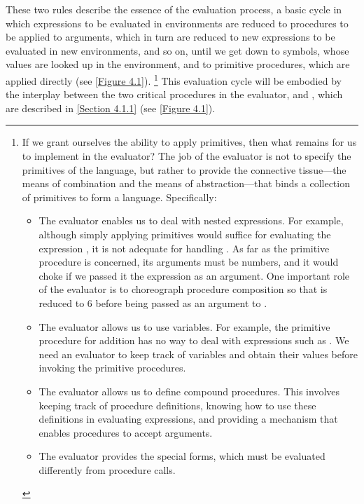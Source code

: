 These two rules describe the essence of the evaluation process, a basic cycle in which expressions to be evaluated in environments are reduced to procedures to be applied to arguments, which in turn are reduced to new expressions to be evaluated in new environments, and so on, until we get down to symbols, whose values are looked up in the environment, and to primitive procedures, which are applied directly (see \cref{Figure 4.1}).%
\footnote{
	If we grant ourselves the ability to apply primitives, then what remains for us to implement in the evaluator?
The job of the evaluator is not to specify the primitives of the language, but rather to provide the connective tissue---the means of combination and the means of abstraction---that binds a collection of primitives to form a language.
Specifically:
\begin{itemize}

	\item
		The evaluator enables us to deal with nested expressions.
		For example, although simply applying primitives would suffice for evaluating the expression , it is not adequate for handling .
		As far as the primitive procedure \code{+} is concerned, its arguments must be numbers, and it would choke if we passed it the expression  as an argument.
		One important role of the evaluator is to choreograph procedure composition so that  is reduced to 6 before being passed as an argument to \code{+}.

	\item
		The evaluator allows us to use variables.
		For example, the primitive procedure for addition has no way to deal with expressions such as .
		We need an evaluator to keep track of variables and obtain their values before invoking the primitive procedures.

	\item
		The evaluator allows us to define compound procedures.
		This involves keeping track of procedure definitions, knowing how to use these definitions in evaluating expressions, and providing a mechanism that enables procedures to accept arguments.

	\item
		The evaluator provides the special forms, which must be evaluated differently
	from procedure calls.

\end{itemize}
}
This evaluation cycle will be embodied by the interplay between the two critical procedures in the evaluator,  and , which are described in \cref{Section 4.1.1} (see \cref{Figure 4.1}).

